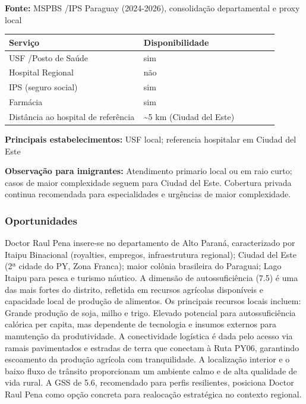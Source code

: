 \textbf{Fonte:} MSPBS /\allowbreak  IPS Paraguay (2024-2026), consolidação
departamental e proxy local

{\def\LTcaptype{none} %
\begin{longtable}{@{}>{\raggedright\arraybackslash}p{0.45\linewidth} >{\raggedright\arraybackslash}p{0.45\linewidth}@{}}
\toprule\noalign{}
Serviço & Disponibilidade \\
\midrule\noalign{}
\endhead
\bottomrule\noalign{}
\endlastfoot
USF /\allowbreak  Posto de Saúde & sim \\
Hospital Regional & não \\
IPS (seguro social) & sim \\
Farmácia & sim \\
Distância ao hospital de referência & \textasciitilde5 km (Ciudad del
Este) \\
\end{longtable}
}

\textbf{Principais estabelecimentos:} USF local; referencia hospitalar
em Ciudad del Este

\textbf{Observação para imigrantes:} Atendimento primario local ou em
raio curto; casos de maior complexidade seguem para Ciudad del Este.
Cobertura privada continua recomendada para especialidades e urgências
de maior complexidade.
\newpage

\subsubsection*{Oportunidades}\label{oport-doctor-raul-pena-1003}
Doctor Raul Pena insere-se no departamento de Alto Paraná, caracterizado por Itaipu Binacional (royalties, empregos, infraestrutura regional); Ciudad del Este (2ª cidade do PY, Zona Franca); maior colônia brasileira do Paraguai; Lago Itaipu para pesca e turismo náutico. A dimensão de autossuficiência (7.5) é uma das mais fortes do distrito, refletida em recursos agrícolas disponíveis e capacidade local de produção de alimentos. Os principais recursos locais incluem: Grande produção de soja, milho e trigo. Elevado potencial para autossuficiência calórica per capita, mas dependente de tecnologia e insumos externos para manutenção da produtividade. A conectividade logística é dada pelo acesso via ramais pavimentados e estradas de terra que conectam à Ruta PY06, garantindo escoamento da produção agrícola com tranquilidade. A localização interior e o baixo fluxo de trânsito proporcionam um ambiente calmo e de alta qualidade de vida rural. A GSS de 5.6, recomendado para perfis resilientes, posiciona Doctor Raul Pena como opção concreta para realocação estratégica no contexto regional.

